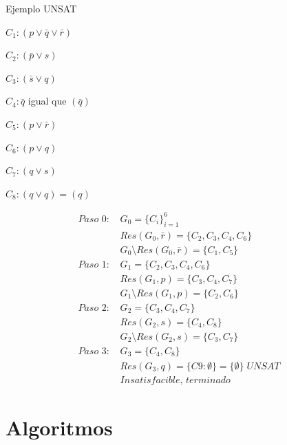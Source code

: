 \documentclass[12pt, twoside, openright]{report} %
\begin{document}
Ejemplo UNSAT
\begin{multicols}{2}

	$C_{1}:(p \vee \bar{q} \vee \bar{r})$

	$C_{2}:(\bar{p} \vee s)$

	$C_{3}:(\bar{s} \vee q)$

	$C_{4}: \bar{q}$ igual que $(\bar{q})$

	$C_{5}:(p \vee \bar{r})$

	$C_{6}:(p \vee q)$

	$C_{7}: (q \vee s)$

	$C_{8}:(q \vee q)=(q)$

	\columnbreak

	\begin{align*}
		\textit{Paso 0: } & G_0 = \{C_i\}_{i=1}^6                                                 \\
		                  & Res(G_0, \bar{r}) = \{ C_2, C_3, C_4, C_6 \}                          \\
		                  & G_0 \setminus Res(G_0, \bar{r}) = \{ C_1, C_5 \}                      \\
		\textit{Paso 1: } & G_1 = \{C_2, C_3, C_4, C_6\}                                          \\
		                  & Res(G_1, p) = \{ C_3, C_4, C_7 \}                                     \\
		                  & G_1 \setminus Res(G_1, p) = \{ C_2, C_6 \}                            \\
		\textit{Paso 2: } & G_2 = \{C_3, C_4, C_7\}                                               \\
		                  & Res(G_2, s) = \{ C_4, C_8 \}                                          \\
		                  & G_2 \setminus Res(G_2, s) = \{ C_3, C_7 \}                            \\
		\textit{Paso 3: } & G_3 = \{C_4, C_8\}                                                    \\
		                  & Res(G_3, q) = \{ C9: \emptyset \} = \{ \emptyset \} \; \textit{UNSAT} \\
		                  & \textit{Insatisfacible, terminado}
	\end{align*}

\end{multicols}

\pagebreak
\section{Algoritmos}
\end{document}
